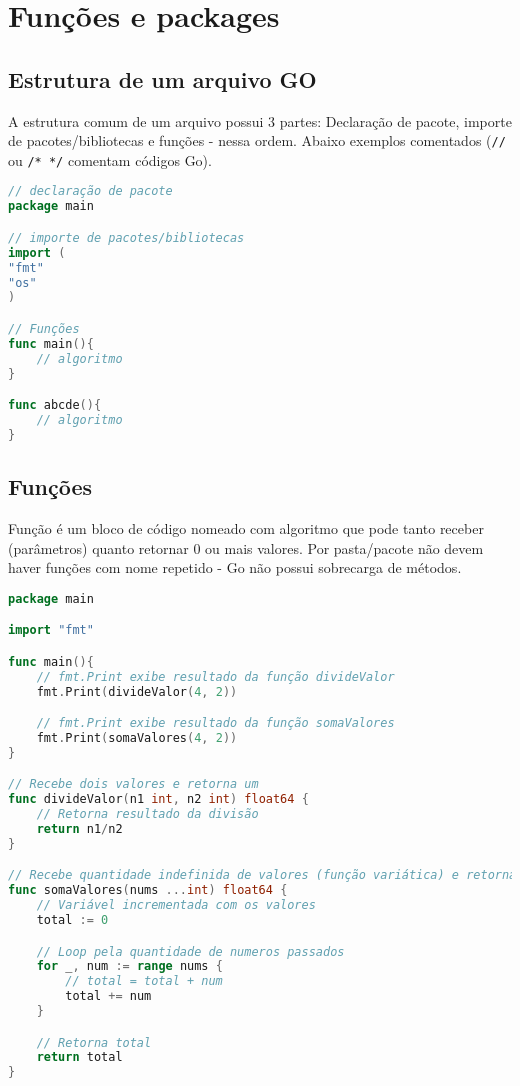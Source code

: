 \documentclass{apostila}
\begin{document}










\chapter{Funções e packages}
\section{Estrutura de um arquivo GO}
A estrutura comum de um arquivo possui 3 partes: Declaração de pacote, importe de pacotes/bibliotecas e funções - nessa ordem. Abaixo exemplos comentados (\texttt{//} ou  \texttt{/* */} comentam códigos Go).

\begin{lstlisting}[language=go,caption=Estrutura de um arquivo.go]
// declaração de pacote
package main

// importe de pacotes/bibliotecas
import (
"fmt"
"os"
)

// Funções
func main(){
    // algoritmo
}

func abcde(){
    // algoritmo
}
\end{lstlisting}



\section{Funções}
Função é um bloco de código nomeado com algoritmo que pode tanto receber (parâmetros) quanto retornar 0 ou mais valores\cite[15]{cod3r}. Por pasta/pacote não devem haver funções com nome repetido\cite[8]{cod3r} - Go não possui sobrecarga de métodos.

\begin{lstlisting}[language=go,caption=Funções]
package main

import "fmt"

func main(){
    // fmt.Print exibe resultado da função divideValor
    fmt.Print(divideValor(4, 2))

    // fmt.Print exibe resultado da função somaValores
    fmt.Print(somaValores(4, 2))
}

// Recebe dois valores e retorna um
func divideValor(n1 int, n2 int) float64 {
    // Retorna resultado da divisão
    return n1/n2
}

// Recebe quantidade indefinida de valores (função variática) e retorna um
func somaValores(nums ...int) float64 {
    // Variável incrementada com os valores
    total := 0

    // Loop pela quantidade de numeros passados
    for _, num := range nums {
        // total = total + num
        total += num
    }

    // Retorna total
    return total
}
\end{lstlisting}
\end{document}
